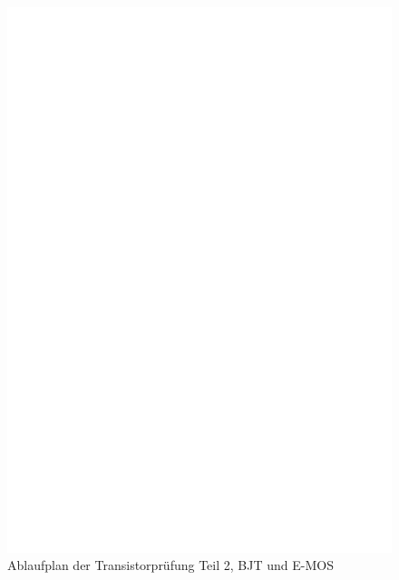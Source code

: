 \begin{figure}[H]
\centering
\includegraphics[]{../FIG/CheckSemi2.eps}
\caption{Ablaufplan der Transistorprüfung Teil 2, BJT und E-MOS}
\label{fig:ChkSemi2}
\end{figure}

